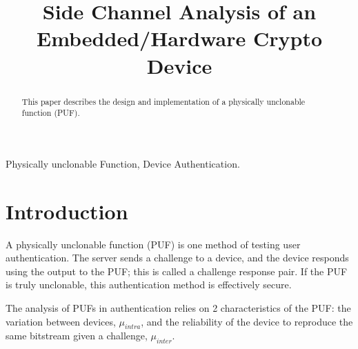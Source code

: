 
\usepackage{tikz}
\usetikzlibrary{shapes}
\usepackage{verbatim}
\usepackage{listings}


\title{Side Channel Analysis of an Embedded/Hardware Crypto Device}

\author{
}

\maketitle


\begin{abstract}
%
This paper describes the design and implementation of a physically unclonable function (PUF). 

 
\end{abstract}

\begin{IEEEkeywords}
Physically unclonable Function, Device Authentication.
\end{IEEEkeywords}

\section{Introduction}
	A physically unclonable function (PUF) is one method of testing user authentication. The server sends a challenge to a device, and the device responds using the output to the PUF; this is called a challenge response pair. If the PUF is truly unclonable, this authentication method is effectively secure. 

	The analysis of PUFs in authentication relies on 2 characteristics of the PUF: the variation between devices, $\mu_{intra}$, and the reliability of the device to reproduce the same bitstream given a challenge, $\mu_{inter}$. 


